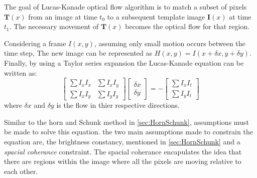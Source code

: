 \documentclass{UoNMCHA}
\numberwithin{equation}{section}
\begin{document}
The goal of Lucas-Kanade optical flow algorithm is to match a subset of pixels $\mathbf{T}(x)$ from an image at time $t_0$ to a subsequent template image $\mathbf{I}(x)$ at time $t_1$. The necessary movement of $\mathbf{T}(x)$ becomes the optical flow for that region. 

Considering a frame $I(x, y)$, assuming only small motion occurs between the time step, The new image can be represented as $H(x, y) = I(x + \delta x, y + \delta y)$. Finally, by using a Taylor series expansion the Lucas-Kanade equation can be written as:
\begin{equation}
	\begin{bmatrix}
		\sum{I_{x}I_{x}} & \sum{I_{x}I_{y}} \\
		\sum{I_{x}I_{y}} & \sum{I_{y}I_{y}}
	\end{bmatrix}
	\begin{bmatrix}
		\delta x \\
		\delta y
	\end{bmatrix} = -
	\begin{bmatrix}
		\sum{I_{x}I_{t}}\\
		\sum{I_{y}I_{t}}
	\end{bmatrix}
\end{equation}
where $\delta x$ and $\delta y$ is the flow in thier respective directions.

Similar to the horn and Schunk method in \cref{sec:HornSchunk}, assumptions must be made to solve this equation. the two main assumptions made to constrain the equation are, the brightness constancy, mentioned in \cref{sec:HornSchunk} and a \textit{spacial coherance} constraint. The spacial coherance encapulates the idea that there are regions within the image where all the pixels are moving relative to each other.
\end{document}
